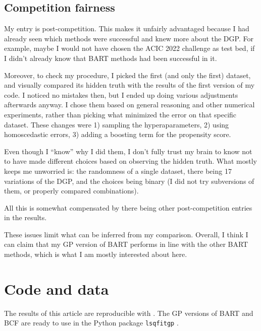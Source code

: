\documentclass[a4paper]{article}
\theoremstyle{definition}
\begin{document}
    \subsection{Competition fairness}

    My entry is post-competition. This makes it unfairly advantaged because I had already seen which methods were successful and knew more about the DGP. For example, maybe I would not have chosen the ACIC 2022 challenge as test bed, if I didn't already know that BART methods had been successful in it.

    Moreover, to check my procedure, I picked the first (and only the first) dataset, and visually compared its hidden truth with the results of the first version of my code. I noticed no mistakes then, but I ended up doing various adjustments afterwards anyway. I chose them based on general reasoning and other numerical experiments, rather than picking what minimized the error on that specific dataset. These changes were 1) sampling the hyperaparameters, 2) using homoscedastic errors, 3) adding a boosting term for the propensity score.

    Even though I ``know'' why I did them, I don't fully trust my brain to know not to have made different choices based on observing the hidden truth. What mostly keeps me unworried is: the randomness of a single dataset, there being 17 variations of the DGP, and the choices being binary (I did not try subversions of them, or properly compared combinations).

    All this is somewhat compensated by there being other post-competition entries in the results.

    These issues limit what can be inferred from my comparison. Overall, I think I can claim that my GP version of BART performs in line with the other BART methods, which is what I am mostly interested about here.

    \section{Code and data}

    The results of this article are reproducible with \textcite{petrillo2024d}. The GP versions of BART and BCF are ready to use in the Python package \texttt{lsqfitgp} \autocite{petrillo2024c}.
        
\end{document}
